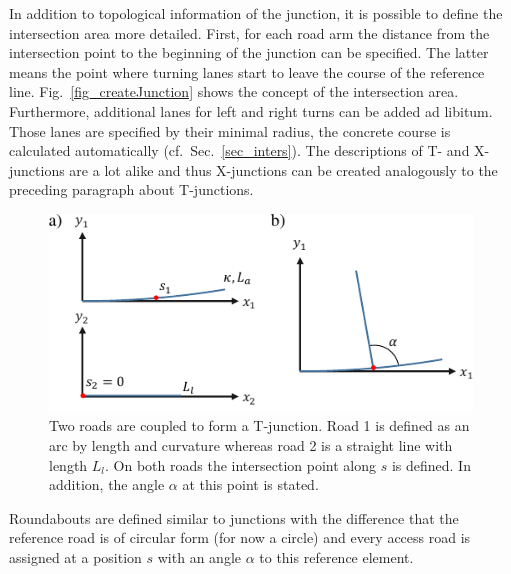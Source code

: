 \documentclass[a4paper, 10pt, conference]{ieeeconf}      %
\begin{document}
In addition to topological information of the junction, it is possible to define the intersection area more detailed. First, for each road arm the distance from the intersection point to the beginning of the junction can be specified. The latter means the point where turning lanes start to leave the course of the reference line. Fig.~\ref{fig_createJunction} shows the concept of the intersection area. Furthermore, additional lanes for left and right turns can be added ad libitum. Those lanes are specified by their minimal radius, the concrete course is calculated automatically (cf.~Sec.~\ref{sec_inters}). The descriptions of T- and X-junctions are a lot alike and thus X-junctions can be created analogously to the preceding paragraph about T-junctions.
\begin{figure}[thpb] 		
	\centering
	\includegraphics{fig/junctionDef.pdf}	
	\caption{Two roads are coupled to form a T-junction. Road 1 is defined as an arc by length and curvature whereas road 2 is a straight line with length $L_l$. On both roads the intersection point along $s$ is defined. In addition, the angle $\alpha$ at this point is stated. }
	\label{fig_juncDef}
\end{figure}

Roundabouts are defined similar to junctions with the difference that the reference road is of circular form (for now a circle) and every access road is assigned at a position $s$ with an angle $\alpha$ to this reference element.
\end{document}
